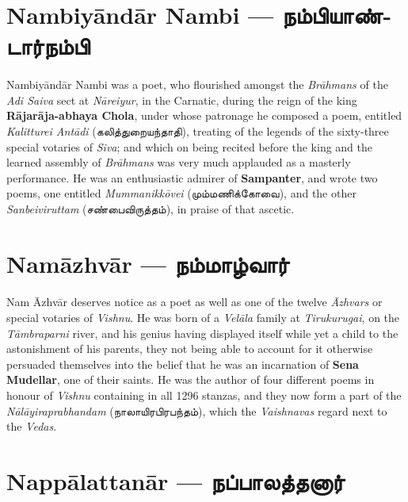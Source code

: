 \documentclass{article}
\newcommand{\TamilText}[1]{\texttamil{#1}}
\newcommand{\TamilBold}[1]{\texttamil{\textbf{#1}}}
\newcommand{\tam}[1]{\TamilText{#1}}
\newcommand{\tambold}[1]{\TamilBold{#1}}
\begin{document}
\section{Nambiy\={a}nd\={a}r Nambi --- \tambold{நம்பியாண்டார்நம்பி}}
\paragraph{}
Nambiy\={a}nd\={a}r Nambi was a poet, who flourished amongst the \emph{Br\={a}hmans} of the \emph{Adi Saiva} sect at \emph{N\={a}reiyur}, in the Carnatic, during the reign of the king \textbf{R\={a}jar\={a}ja-abhaya Chola}, under whose patronage he composed a poem, entitled \emph{Kalitturei Ant\={a}di} (\tam{கலித்துறையந்தாதி}), treating of the legends of the sixty-three special votaries of \emph{Siva}; and which on being recited before the king and the learned assembly of \emph{Br\={a}hmans} was very much applauded as a masterly performance. He was an enthusiastic admirer of \textbf{Sampanter}, and wrote two poems, one entitled \emph{Mummanikk\={o}vei} (\tam{மும்மணிக்கோவை}), and the other \emph{Sanbeiviruttam} (\tam{சண்பைவிருத்தம்}), in praise of that ascetic.

\section{Nam\={a}zhv\={a}r --- \tambold{நம்மாழ்வார்}}
\paragraph{}
Nam \={A}zhv\={a}r deserves notice as a poet as well as one of the twelve \emph{\={A}zhvars} or special votaries of \emph{Vishnu}. He was born of a \emph{Vel\={a}la} family at \emph{Tirukurugai}, on the \emph{T\={a}mbraparni} river, and his genius having displayed itself while yet a child to the astonishment of his parents, they not being able to account for it otherwise persuaded themselves into the belief that he was an incarnation of \textbf{Sena Mudellar}, one of their saints. He was the author of four different poems in honour of \emph{Vishnu} containing in all 1296 stanzas, and they now form a part of the \emph{N\={a}l\={a}yiraprabhandam} (\tam{நாலாயிரபிரபந்தம்}), which the \emph{Vaishnavas} regard next to the \emph{Vedas}.

\section{Napp\={a}lattan\={a}r --- \tambold{நப்பாலத்தனார்}}
\end{document}
